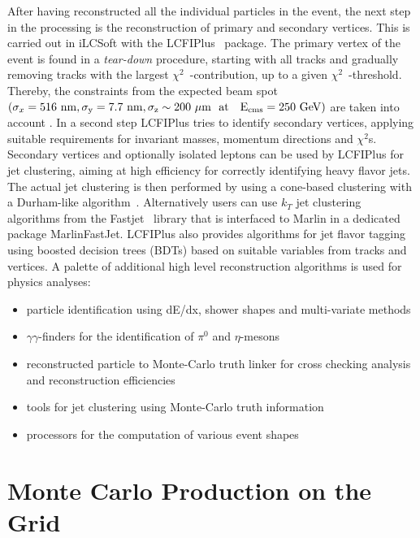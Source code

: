 After having reconstructed all the individual particles in the event, the next step in the processing is the reconstruction of
primary and secondary vertices. This is carried out in iLCSoft with the LCFIPlus~\cite{Suehara:2015ura} package.
The primary vertex of the event is found in a \emph{tear-down} procedure, starting with all tracks and gradually removing tracks with
the largest $\chi^2$~-contribution, up to a given  $\chi^2$~-threshold. Thereby, the constraints from the expected beam spot
$(\sigma_x=516~\rm{nm}, \sigma_y=7.7~\rm{nm},\sigma_z \sim 200~\mu\rm{m}~~\rm{at}~~~E_{cms}=250~\rm{GeV})$ are taken into account .
In a second step LCFIPlus tries to identify secondary vertices, applying suitable requirements for invariant masses, momentum directions
and $\chi^2$s. Secondary vertices and optionally isolated leptons can be used by LCFIPlus for jet clustering, aiming at high efficiency for correctly
identifying heavy flavor jets. The actual jet clustering is then performed by using a cone-based clustering with a Durham-like algorithm~\cite{Catani:1991hj}.
Alternatively users can use $k_T$ jet clustering algorithms from the Fastjet~\cite{Cacciari:2006sm} library that is interfaced to Marlin in a
dedicated package MarlinFastJet. LCFIPlus also provides algorithms for jet flavor tagging using boosted decision trees (BDTs) based on suitable
variables from tracks and vertices. A palette of additional high level reconstruction algorithms is used for physics analyses:
\begin{itemize}
\item particle identification using dE/dx, shower shapes and multi-variate methods
\item $\gamma\gamma$-finders for the identification of $\pi^0$ and $\eta$-mesons
\item reconstructed particle to Monte-Carlo truth linker for cross checking analysis and reconstruction efficiencies
\item tools for jet clustering using Monte-Carlo truth information
\item processors for the computation of various event shapes
\end{itemize}



\section{\label{sec:monte-carlo} Monte Carlo Production on the Grid}

